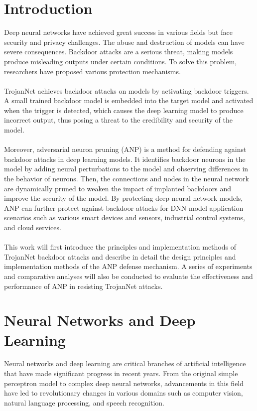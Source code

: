 \documentclass[english,version-2022-01]{uzl-thesis}
\begin{document}
\chapter{Introduction} 
Deep neural networks have achieved great success in various fields but face security and privacy challenges. The abuse and destruction of models can have severe consequences. Backdoor attacks are a serious threat, making models produce misleading outputs under certain conditions. To solve this problem, researchers have proposed various protection mechanisms. \\
\\
TrojanNet\cite{tang2020embarrassingly} achieves backdoor attacks on models by activating backdoor triggers. A small trained backdoor model is embedded into the target model and activated when the trigger is detected, which causes the deep learning model to produce incorrect output, thus posing a threat to the credibility and security of the model. \\
\\
Moreover, adversarial neuron pruning (ANP)\cite{wu2021adversarial} is a method for defending against backdoor attacks in deep learning models. It identifies backdoor neurons in the model by adding neural perturbations to the model and observing differences in the behavior of neurons. Then, the connections and nodes in the neural network are dynamically pruned to weaken the impact of implanted backdoors and improve the security of the model. By protecting deep neural network models, ANP can further protect against backdoor attacks for DNN model application scenarios such as various smart devices and sensors, industrial control systems, and cloud services.\\
\\
This work will first introduce the principles and implementation methods of TrojanNet backdoor attacks and describe in detail the design principles and implementation methods of the ANP defense mechanism. A series of experiments and comparative analyses will also be conducted to evaluate the effectiveness and performance of ANP in resisting TrojanNet attacks.


\chapter{Neural Networks and Deep Learning}
Neural networks and deep learning are critical branches of artificial intelligence that have made significant progress in recent years. From the original simple perceptron model to complex deep neural networks, advancements in this field have led to revolutionary changes in various domains such as computer vision, natural language processing, and speech recognition.
\end{document}
